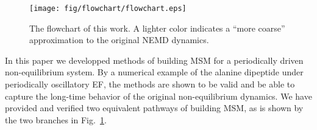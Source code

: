 \documentclass[aps, pre, preprint,unsortedaddress,a4paper,onecolumn]{revtex4}
\begin{document}
\begin{figure}
  \centering
  \texttt{[image: fig/flowchart/flowchart.eps]}
  \caption{The flowchart of this work. A lighter color indicates
  a ``more coarse'' approximation to the original NEMD dynamics.}
  \label{fig:flowchart}
\end{figure}

In this paper we developped methods of building MSM for a periodically driven
non-equilibrium system. By a numerical example
of the alanine dipeptide under periodically oscillatory EF,
the methods are shown  to be
valid and be able to capture the long-time behavior of the original
non-equilibrium dynamics. We have provided and verified two equivalent
pathways of building MSM, as is shown by the two branches in
Fig.~\ref{fig:flowchart}.
\end{document}
